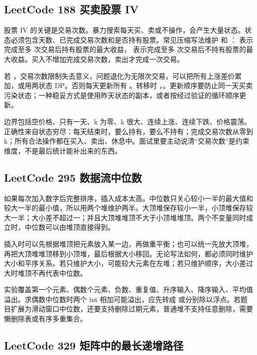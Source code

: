 \subsection{LeetCode 188 买卖股票 IV}

股票 IV 的关键是交易次数。暴力搜索每天买、卖或不操作，会产生大量状态。状态必须包含天数、已完成交易次数和是否持有股票。常见压缩写法维护  和 ： 表示完成至多  次交易后持有股票的最大收益， 表示完成至多  次交易后不持有股票的最大收益。买入不增加完成交易次数，卖出才完成一次交易。

若 ，交易次数限制失去意义，问题退化为无限次交易，可以把所有上涨差价累加，或用两状态 DP。否则每天更新所有 。转移时 ，。更新顺序要防止同一天买卖污染状态；一种稳妥方式是使用昨天状态的副本，或者按经过验证的循环顺序更新。

边界包括空价格、只有一天、k 为零、k 很大、连续上涨、连续下跌、价格震荡。正确性来自状态穷尽：每天结束时，要么持有，要么不持有；完成交易次数从零到 k；所有合法操作都在买入、卖出、休息中。面试里要主动说清“交易次数”是约束维度，不是最后统计能补出来的东西。

\subsection{LeetCode 295 数据流中位数}

如果每次加入数字后完整排序，插入成本太高。中位数只关心较小一半的最大值和较大一半的最小值，所以用两个堆维护两半。大顶堆保存较小一半，小顶堆保存较大一半；大小差不超过一；并且大顶堆堆顶不大于小顶堆堆顶。两个不变量同时成立时，中位数可以由堆顶直接得到。

插入时可以先根据堆顶把元素放入某一边，再做重平衡；也可以统一先放大顶堆，再把大顶堆堆顶移到小顶堆，最后根据大小移回。无论写法如何，都必须同时维护大小和平序关系。若只维护大小，可能较大元素在左堆；若只维护顺序，大小差过大时堆顶不再代表中位数。

实验覆盖第一个元素、偶数个元素、负数、重复值、升序输入、降序输入、平均值溢出。求偶数中位数时两个 int 相加可能溢出，应先转成  或分别除以浮点。若题目扩展为滑动窗口中位数，还要支持删除过期元素，普通堆不支持任意删除，需要懒删除表或有序多重集合。

\subsection{LeetCode 329 矩阵中的最长递增路径}


